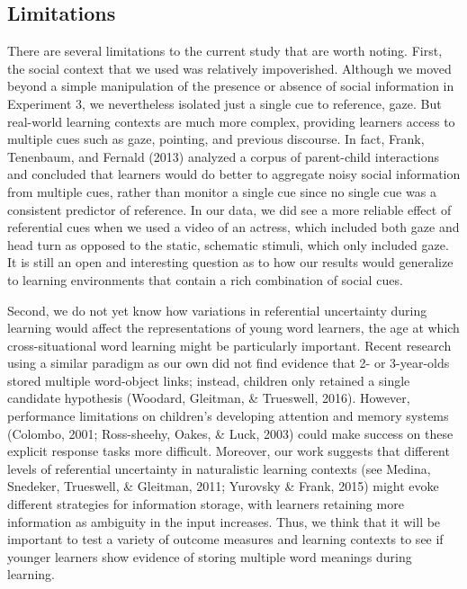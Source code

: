 \documentclass[oneside]{report}
\begin{document}
\subsection{Limitations}\label{limitations}

There are several limitations to the current study that are worth
noting. First, the social context that we used was relatively
impoverished. Although we moved beyond a simple manipulation of the
presence or absence of social information in Experiment 3, we
nevertheless isolated just a single cue to reference, gaze. But
real-world learning contexts are much more complex, providing learners
access to multiple cues such as gaze, pointing, and previous discourse.
In fact, Frank, Tenenbaum, and Fernald (2013) analyzed a corpus of
parent-child interactions and concluded that learners would do better to
aggregate noisy social information from multiple cues, rather than
monitor a single cue since no single cue was a consistent predictor of
reference. In our data, we did see a more reliable effect of referential
cues when we used a video of an actress, which included both gaze and
head turn as opposed to the static, schematic stimuli, which only
included gaze. It is still an open and interesting question as to how
our results would generalize to learning environments that contain a
rich combination of social cues.

Second, we do not yet know how variations in referential uncertainty
during learning would affect the representations of young word learners,
the age at which cross-situational word learning might be particularly
important. Recent research using a similar paradigm as our own did not
find evidence that 2- or 3-year-olds stored multiple word-object links;
instead, children only retained a single candidate hypothesis (Woodard,
Gleitman, \& Trueswell, 2016). However, performance limitations on
children's developing attention and memory systems (Colombo, 2001;
Ross-sheehy, Oakes, \& Luck, 2003) could make success on these explicit
response tasks more difficult. Moreover, our work suggests that
different levels of referential uncertainty in naturalistic learning
contexts (see Medina, Snedeker, Trueswell, \& Gleitman, 2011; Yurovsky
\& Frank, 2015) might evoke different strategies for information
storage, with learners retaining more information as ambiguity in the
input increases. Thus, we think that it will be important to test a
variety of outcome measures and learning contexts to see if younger
learners show evidence of storing multiple word meanings during
learning.
\end{document}

